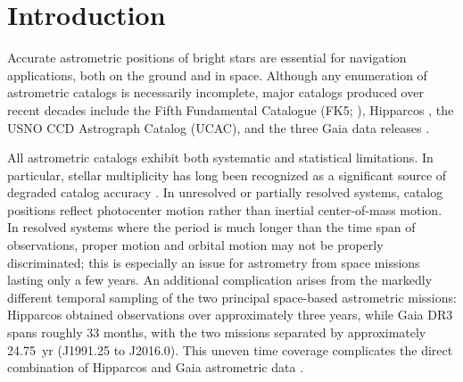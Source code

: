 \documentclass[linenumbers,trackchanges]{aastex701}
\begin{document}

\section{Introduction}

Accurate astrometric positions of bright stars are essential for navigation applications, both on the ground and in
space. Although any enumeration of astrometric catalogs is necessarily incomplete, major catalogs produced over recent
decades include the Fifth Fundamental Catalogue (FK5; \citealt{1988VeARI..32....1F}), Hipparcos
\citep{1997A&A...323L..49P}, the USNO CCD Astrograph Catalog (UCAC)\citep{2000AJ....120.2131Z,2017AJ....153..166Z}, and
the three Gaia data releases \citep{2016A&A...595A...2G,2018A&A...616A...1G,2023A&A...674A...1G}. 

All astrometric catalogs exhibit both systematic and statistical limitations. In particular, stellar multiplicity has
long been recognized as a significant source of degraded catalog accuracy
\citep{1975ARA&A..13..295V,1997A&A...323L..49P,1999A&A...341..121S,2001A&A...372..935P,2017ApJ...840L...1M}. In
unresolved or partially resolved systems, catalog positions reflect photocenter motion rather than inertial
center-of-mass motion. In resolved systems where the period is much longer than the time span of observations, proper
motion and orbital motion may not be properly discriminated; this is especially an issue for astrometry from space
missions lasting only a few years. An additional complication arises from the markedly different temporal sampling of
the two principal space-based astrometric missions: Hipparcos obtained observations over approximately three years,
while Gaia DR3 spans roughly 33 months, with the two missions separated by approximately 24.75~yr (J1991.25 to
J2016.0). This uneven time coverage complicates the direct combination of Hipparcos and Gaia astrometric data 
\citep{2019A&A...623A..72K}. 
\end{document}
